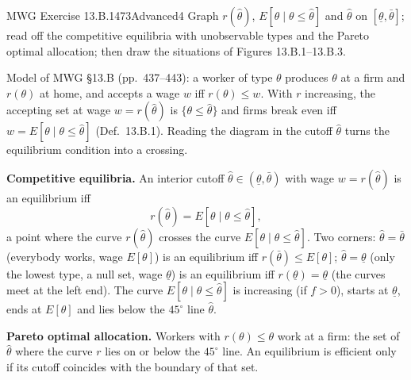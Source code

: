 \begin{exsol}{MWG Exercise 13.B.1}{473}{Advanced}{4}
\asked Graph $r(\hat\theta)$, $E[\theta\mid\theta\le\hat\theta]$ and $\hat\theta$ on $[\underline\theta,\bar\theta]$;
read off the competitive equilibria with unobservable types and the Pareto optimal allocation;
then draw the situations of Figures 13.B.1--13.B.3.

\method Model of MWG \S13.B (pp.~437--443): a worker of type $\theta$ produces $\theta$ at a
firm and $r(\theta)$ at home, and accepts a wage $w$ iff $r(\theta)\le w$. With $r$ increasing, the accepting set at wage $w=r(\hat\theta)$ is
$\{\theta\le\hat\theta\}$ and firms break even iff $w=E[\theta\mid\theta\le\hat\theta]$ (Def.~13.B.1).
Reading the diagram in the cutoff $\hat\theta$ turns the equilibrium condition into a crossing.

\solution
\textbf{Competitive equilibria.} An interior cutoff $\hat\theta\in(\underline\theta,\bar\theta)$ with
wage $w=r(\hat\theta)$ is an equilibrium iff
\[
  r(\hat\theta)=E[\theta\mid\theta\le\hat\theta],
\]
a point where the curve $r(\hat\theta)$ crosses the curve $E[\theta\mid\theta\le\hat\theta]$. Two
corners: $\hat\theta=\bar\theta$ (everybody works, wage $E[\theta]$) is an equilibrium iff
$r(\bar\theta)\le E[\theta]$; $\hat\theta=\underline\theta$ (only the lowest type, a null set, wage $\underline\theta$)
is an equilibrium iff $r(\underline\theta)=\underline\theta$ (the curves meet at the left end). The curve $E[\theta\mid\theta\le\hat\theta]$ is increasing
(if $f>0$), starts at $\underline\theta$, ends at $E[\theta]$ and lies below the $45^\circ$ line $\hat\theta$.

\textbf{Pareto optimal allocation.} Workers with $r(\theta)\le\theta$ work at a firm: the set of
$\hat\theta$ where the curve $r$ lies on or below the $45^\circ$ line. An equilibrium is efficient only if
its cutoff coincides with the boundary of that set.


\end{exsol}
